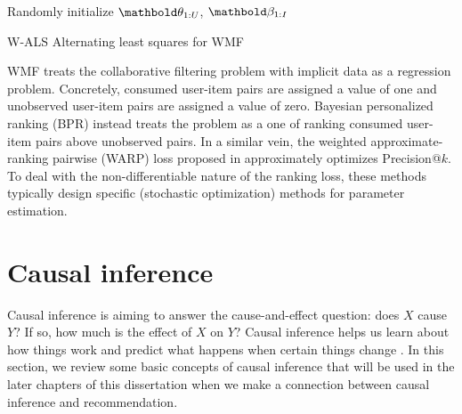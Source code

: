 \begin{algorithm}
\DontPrintSemicolon %
Randomly initialize $\mb\theta_{1:U}$, $\mb\beta_{1:I}$\;
\;
\caption{{\sc W-ALS} Alternating least squares for \gls{WMF}}
\label{chpt:background:algo:wmf}
\end{algorithm}

\gls{WMF} treats the collaborative filtering problem with implicit data as a
regression problem. Concretely, consumed user-item pairs are assigned a
value of one and unobserved user-item pairs are assigned a value of zero.
Bayesian personalized ranking (BPR) \citep{rendle2009bpr,
rendle2014improving} instead treats the problem as a one of ranking
consumed user-item pairs above unobserved pairs.
In a similar vein, the weighted approximate-ranking pairwise (WARP) loss
proposed in \citet{weston2011wsabie} approximately optimizes Precision@$k$. 
To deal with the non-differentiable nature of the ranking
loss, these methods typically design specific (stochastic optimization)
methods for parameter estimation.


\section{Causal inference}\label{chpt:background:sec:causal}

Causal inference is aiming to answer the cause-and-effect question: does $X$ cause $Y$? If so, how much is the effect of $X$ on $Y$? Causal inference helps us learn about how things work and predict what happens when certain things change \citep{morgan2014counterfactuals,imbens2015causal}. 
In this section, we review some basic concepts of causal inference that will be used in the later chapters of this dissertation when we make a connection between causal inference and recommendation.  

